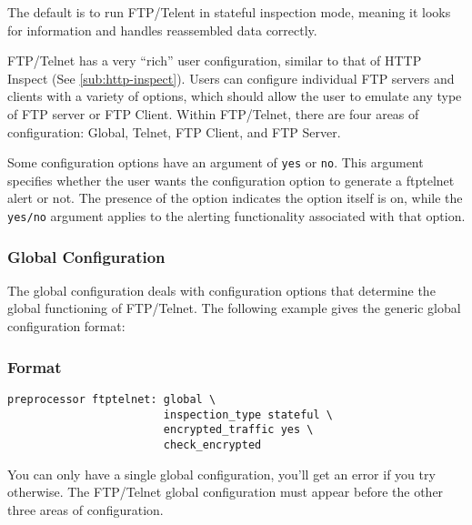 \documentclass[english]{report}
\newenvironment{note}{
\samepage
    \vspace{10pt}{\textsf{
        {\hspace{7pt}\Huge{$\triangle$\hspace{-12.5pt}{\Large{$^!$}}}}\hspace{5pt}
        {\Large{NOTE}}
    }
    }
   \begin{center}
    \par\vspace{-17pt}

    \begin{lrbox}{\savepar}
    \begin{minipage}[r]{6in}
}
{
    \end{minipage}
    \end{lrbox}
    \fbox{
        \usebox{
            \savepar
	}
    }
    \par\vskip10pt
    \end{center}
}
\newenvironment{note}{
        \begin{rawhtml}
        <p><table border="1"><tr><td><b>
        Note:&nbsp;&nbsp;</b>
        \end{rawhtml}
}{
        \begin{rawhtml}
        </b></td></tr></table></p>
        \end{rawhtml}
}
\begin{document}
The default is to run FTP/Telent in stateful inspection mode, meaning
it looks for information and handles reassembled data correctly.

FTP/Telnet has a very ``rich'' user configuration, similar to that of
HTTP Inspect (See \ref{sub:http-inspect}).  Users can configure
individual FTP servers and clients with a variety of options, which
should allow the user to emulate any type of FTP server or FTP Client.
Within FTP/Telnet, there are four areas of configuration: Global,
Telnet, FTP Client, and FTP Server.

\begin{note}
Some configuration options have an argument of \texttt{yes} or \texttt{no}.
This argument specifies whether the user wants the configuration option to
generate a ftptelnet alert or not.  The presence of the option indicates
the option itself is on, while the \texttt{yes/no} argument applies to the
alerting functionality associated with that option.
\end{note}

\subsubsection{Global Configuration}

The global configuration deals with configuration options that determine the
global functioning of FTP/Telnet.  The following example gives the generic
global configuration format:

\subsubsection{Format}
\begin{verbatim}
preprocessor ftptelnet: global \
                        inspection_type stateful \
                        encrypted_traffic yes \
                        check_encrypted
\end{verbatim}

You can only have a single global configuration, you'll get an error if
you try otherwise.  The FTP/Telnet global configuration must appear
before the other three areas of configuration.
\end{document}
